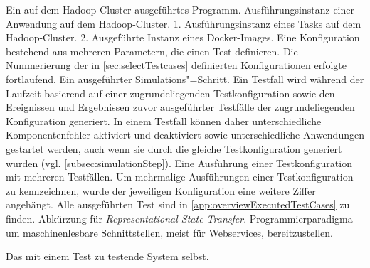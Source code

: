     {Ein auf dem Hadoop-Cluster ausgeführtes Programm.}
    {Ausführungsinstanz einer Anwendung auf dem Hadoop-Cluster.}
    {1. Ausführungsinstanz eines Tasks auf dem Hadoop-Cluster.
        2. Ausgeführte Instanz eines Docker-Images.}
    {Eine Konfiguration bestehend aus mehreren Parametern, die einen Test definieren.
        Die Nummerierung der in \cref{sec:selectTestcases} definierten Konfigurationen erfolgte fortlaufend.}
    {Ein ausgeführter Simulations"=Schritt.
        Ein Testfall wird während der Laufzeit basierend auf einer zugrundeliegenden Testkonfiguration sowie den Ereignissen und Ergebnissen zuvor ausgeführter Testfälle der zugrundeliegenden Konfiguration generiert.
        In einem Testfall können daher unterschiedliche Komponentenfehler aktiviert und deaktiviert sowie unterschiedliche Anwendungen gestartet werden, auch wenn sie durch die gleiche Testkonfiguration generiert wurden (vgl. \cref{subsec:simulationStep}).}
    {Eine Ausführung einer Testkonfiguration mit mehreren Testfällen.
        Um mehrmalige Ausführungen einer Testkonfiguration zu kennzeichnen, wurde der jeweiligen Konfiguration eine weitere Ziffer angehängt.
        Alle ausgeführten Test sind in \cref{app:overviewExecutedTestCases} zu finden.}
    {Abkürzung für \emph{Representational State Transfer}.
        Programmierparadigma um maschinenlesbare Schnittstellen, meist für Webservices, bereitzustellen.}

    {Das mit einem Test zu testende System selbst.}
